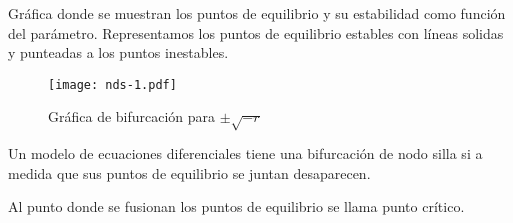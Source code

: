 \begin{tcolorbox}[colback=Black!4, colframe=White, arc=2mm]
\begin{definicion}
  Gráfica donde se muestran los puntos de equilibrio y su estabilidad como función del parámetro. Representamos los puntos de equilibrio estables con líneas solidas y punteadas a los puntos inestables.
\end{definicion}
\end{tcolorbox}
\begin{figure}[H]
  \centering
  \texttt{[image: nds-1.pdf]}
  \caption{Gráfica de bifurcación para $\pm \sqrt{-r}$}
\end{figure}

\begin{tcolorbox}[colback=Black!4, colframe=White, arc=2mm]
\begin{nota} Un modelo de ecuaciones diferenciales tiene una bifurcación de nodo silla si a medida que sus puntos de equilibrio se juntan desaparecen.
\end{nota}
\end{tcolorbox}
\begin{tcolorbox}[colback=Black!4, colframe=White, arc=2mm]
\begin{definicion}
  Al punto donde se fusionan los puntos de equilibrio se llama punto crítico.
\end{definicion}
\end{tcolorbox}
